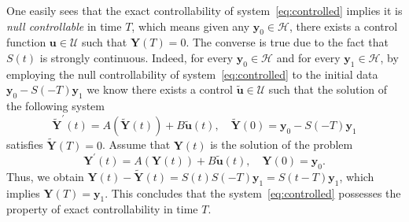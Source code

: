 \documentclass[10pt]{elsarticle}
\begin{document}
One easily sees that the exact controllability of system~\eqref{eq:controlled} implies it is \emph{null controllable} in time $T$, which means given any $\mathbf{y}_0\in \mathcal{H}$, there exists a control function $\mathbf{u}\in \mathcal{U}$ such that $\mathbf{Y} (T)=0$. 
The converse is true due to the fact that $S(t)$ is strongly continuous. 
Indeed, for every $\mathbf{y}_0\in \mathcal{H}$ and for every $\mathbf{y}_1\in \mathcal{H}$, by employing the null controllability of system~\eqref{eq:controlled} to the initial data $\mathbf{y}_0 - S(-T)\mathbf{y}_1$ we know there exists a control $\widetilde{\mathbf{u}}\in \mathcal{U}$ such that the solution of the following system
\begin{equation*} 
{\widetilde{\mathbf{Y}}}^{\prime}(t)=A(\widetilde{\mathbf{Y}}(t))+ B\widetilde{\mathbf{u}}(t), \quad \widetilde{\mathbf{Y}}(0)=\mathbf{y}_0 - S(-T)\mathbf{y}_1
\end{equation*}
satisfies $\widetilde{\mathbf{Y}}(T) = 0$. Assume that $\mathbf{Y}(t)$ is the solution of the problem
\begin{equation*} 
{\mathbf{Y}}^{\prime}(t)=A(\mathbf{Y}(t))+ B\widetilde{\mathbf{u}}(t), \quad \mathbf{Y}(0)=\mathbf{y}_0. 
\end{equation*}
Thus, we obtain $ \mathbf{Y}(t) - \widetilde{\mathbf{Y}}(t) = S(t)S(-T)\mathbf{y}_1 = S(t-T)\mathbf{y}_1$, which implies $ \mathbf{Y}(T) = \mathbf{y}_1$. This concludes that the system~\eqref{eq:controlled} possesses the property of exact controllability in time $T$.
\end{document}
